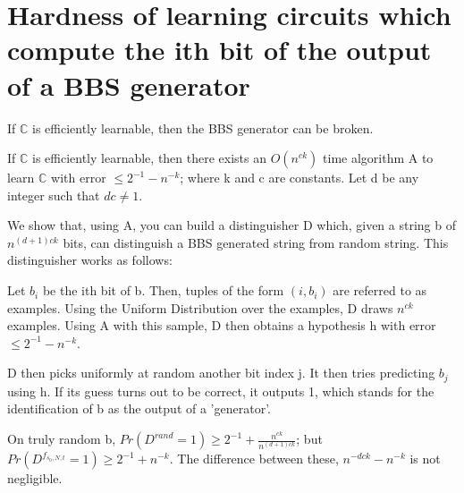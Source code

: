 \documentclass{article}
\begin{document}

\section{Hardness of learning circuits which compute the ith bit of the output of a BBS generator}


\begin{theorem}
 If $\mathbb{C}$ is efficiently learnable, then the BBS generator can be broken.
\end{theorem}
\begin{proof_sketch}
 If $\mathbb{C}$ is efficiently learnable, then there exists an $O(n^{ck})$ time algorithm A to learn $\mathbb{C}$ with error $\leq 2^{-1} - n^{-k}$; where k and c are constants. Let d be any integer such that $dc\neq 1$.

We show that, using A, you can build a distinguisher D which, given a string b of $n^{(d+1)ck}$ bits, can distinguish a BBS generated string from random string. This distinguisher works as follows:

Let $b_{i}$ be the ith bit of b. Then, tuples of the form $(i, b_{i})$ are referred to as examples. Using the Uniform Distribution over the examples, D draws $n^{ck}$ examples. Using A with this sample, D then obtains a hypothesis h with error $\leq 2^{-1} - n^{-k}$.

D then picks uniformly at random another bit index j. It then tries predicting $b_{j}$ using h. If its guess turns out to be correct, it outputs 1, which stands for the identification of b as the output of a 'generator'.

On truly random b, $Pr(D^{rand} = 1)\geq 2^{-1} + \frac{n^{ck}}{n^{(d+1)ck}}$; but $Pr(D^{f_{s_{0}, N, t}} = 1) \geq 2^{-1} + n^{-k}$. The difference between these, $n^{-dck} - n^{-k}$ is not negligible.
\end{proof_sketch}
\end{document}
